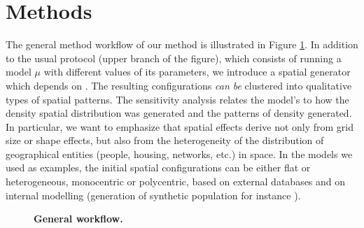 \documentclass[preprint,5p,times,twocolumn,authoryear]{elsarticle}
\begin{document}
\section{Methods}

The general method workflow of our method is illustrated in Figure \ref{fig:method}. In addition to the usual protocol (upper branch of the figure), which consists of running a model $\mu$ with different values of its parameters, we introduce a spatial generator which depends on . The resulting configurations \emph{can be} clustered into qualitative types of spatial patterns. The sensitivity analysis relates the  model's  to how the density spatial distribution was generated and  the patterns of density generated.  In particular, we want to emphasize that spatial effects derive not only from grid size or shape effects, but also from the heterogeneity of the distribution of geographical entities (people, housing, networks, etc.) in space. In the models we used as examples, the initial spatial configurations can be either flat or heterogeneous, monocentric or polycentric, based on external databases and on internal modelling (generation of synthetic population for instance \citep{bhat1999activity}).
\begin{figure}[htbp] 
\begin{center} 
 \caption{\textbf{General workflow.}} \label{fig:method}
\end{center}
\end{figure} %
\end{document}

